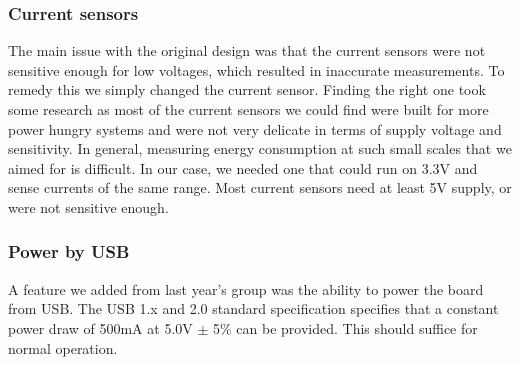 \subsubsection{Current sensors}
The main issue with the original design was that the current sensors were not
sensitive enough for low voltages, which resulted in inaccurate measurements. To
remedy this we simply changed the current sensor. Finding the right one took
some research as most of the current sensors we could find were built for more power hungry systems and were not very delicate in terms
of supply voltage and sensitivity. In general, measuring energy consumption at
such small scales that we aimed for is difficult. In our case, we needed one
that could run on 3.3V and sense currents of the same range. Most current
sensors need at least 5V supply, or were not sensitive
enough.

\subsubsection{Power by USB}
A feature we added from last year's group was the ability to power the board
from USB. The USB 1.x and 2.0 standard specification specifies that a constant
power draw of 500mA at 5.0V $\pm$ 5\% can be provided.  This should suffice for normal operation.
